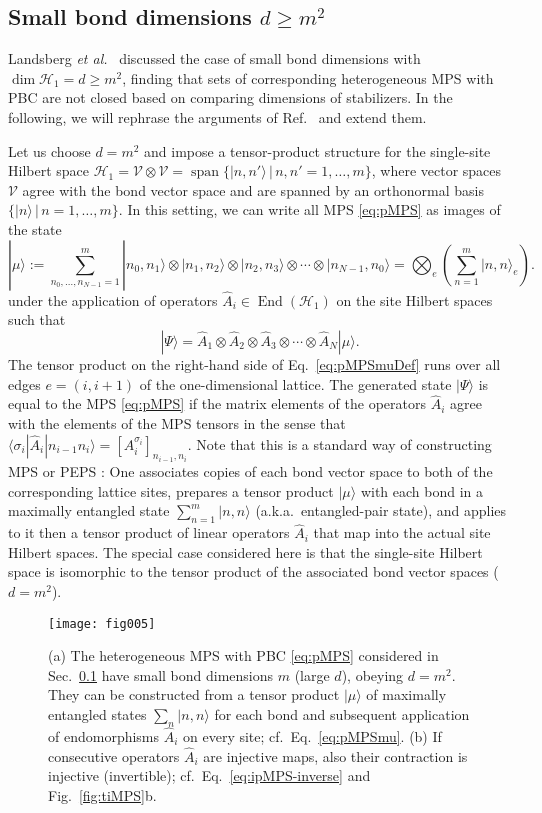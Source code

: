 \documentclass[english,11pt,aps,pra,onecolumn,tightenlines,groupedaddress,superscriptaddress,notitlepage,floatfix,fleqn]{revtex4-1}
\newcommand{\bra}{\langle}
\newcommand{\ket}{\rangle}
\newcommand{\Span}{\operatorname{span}}
\newcommand{\hA}{\hat{A}}
\newcommand{\mc}[1]{\mathcal{#1}}
\renewcommand{\H}{\mc{H}}
\newcommand{\V}{\mc{V}}
\newcommand{\End}{\operatorname{End}}
\begin{document}
\subsection{Small bond dimensions \texorpdfstring{$d\geq m^2$}{d>=m*m}}\label{sec:pMPSsmall}
Landsberg \emph{et al.}~\cite{Landsberg2012-12} discussed the case of small bond dimensions with $\dim\H_1=d\geq m^2$, finding that sets of corresponding heterogeneous MPS with PBC are not closed based on comparing dimensions of stabilizers. In the following, we will rephrase the arguments of Ref.~\cite{Landsberg2012-12} and extend them.

Let us choose $d= m^2$ and impose a tensor-product structure for the single-site Hilbert space $\H_1=\V\otimes\V=\Span\{|n,n'\ket\,|\,n,n'=1,\dotsc,m\}$, where vector spaces $\V$ agree with the bond vector space and are spanned by an orthonormal basis $\{|n\ket\,|\,n=1,\dotsc,m\}$. In this setting, we can write all MPS \eqref{eq:pMPS} as images of the state
\begin{equation}\label{eq:pMPSmuDef}
	|\mu\ket:=\sum_{n_0,\dotsc,n_{N-1}=1}^m|n_0, n_1\ket\otimes|n_1, n_2\ket\otimes |n_2, n_3\ket\otimes\dotsb\otimes |n_{N-1}, n_0\ket
	= \bigotimes_{e}\left(\sum_{n=1}^{m} |n, n\ket_e\right).
\end{equation}
under the application of operators $\hat{A}_i\in\End(\H_1)$ on the site Hilbert spaces such that
\begin{equation}\label{eq:pMPSmu}
	|\Psi\ket=\hat{A}_1\otimes\hat{A}_2\otimes\hat{A}_3\otimes\dotsb\otimes\hat{A}_N|\mu\ket.
\end{equation}
The tensor product on the right-hand side of Eq.~\eqref{eq:pMPSmuDef} runs over all edges $e=(i,i+1)$ of the one-dimensional lattice.
The generated state $|\Psi\ket$ is equal to the MPS \eqref{eq:pMPS} if the matrix elements of the operators $\hat{A}_i$ agree with the elements of the MPS tensors in the sense that $\bra \sigma_i|\hat{A}_i|n_{i-1}n_i\ket=[A_i^{\sigma_i}]_{n_{i-1},n_i}$. Note that this is a standard way of constructing MPS or PEPS \cite{Affleck1988-115,Verstraete2004-7}: One associates copies of each bond vector space to both of the corresponding lattice sites, prepares a tensor product $|\mu\ket$ with each bond in a maximally entangled state $\sum_{n=1}^m|n, n\ket$ (a.k.a.\ entangled-pair state), and applies to it then a tensor product of linear operators $\hat{A}_i$ that map into the actual site Hilbert spaces. The special case considered here is that the single-site Hilbert space is isomorphic to the tensor product of the associated bond vector spaces ($d=m^2$).
\begin{figure*}[t]
\label{fig:pMPS}
\texttt{[image: fig005]}
\caption{(a) The heterogeneous MPS with PBC \eqref{eq:pMPS} considered in Sec.~\ref{sec:pMPSsmall} have small bond dimensions $m$ (large $d$), obeying $d=m^2$. They can be constructed from a tensor product $|\mu\ket$ of maximally entangled states $\sum_n|n,n\ket$ for each bond and subsequent application of endomorphisms $\hA_i$ on every site; cf.\ Eq.~\eqref{eq:pMPSmu}. (b) If consecutive operators $\hA_i$ are injective maps, also their contraction is injective (invertible); cf.\ Eq.~\eqref{eq:ipMPS-inverse} and Fig.~\ref{fig:tiMPS}b.}
\end{figure*}
\end{document}
